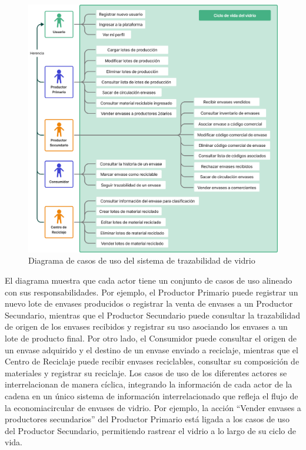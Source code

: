 \begin{figure}[!htb]
    \centering
    \includegraphics[width=\textwidth]{Figures/use-case-diagram.png}
    \caption{Diagrama de casos de uso del sistema de trazabilidad de vidrio}
    \label{fig:use-case-diagram}
\end{figure}

El diagrama muestra que cada actor tiene un conjunto de casos de uso alineado con sus responsabilidades. Por ejemplo, el Productor Primario puede registrar un nuevo lote de envases producidos o registrar la venta de envases a un Productor Secundario, mientras que el Productor Secundario puede consultar la \gls{trazabilidad} de origen de los envases recibidos y registrar su uso asociando los envases a un lote de producto final. Por otro lado, el Consumidor puede consultar el origen de un envase adquirido y el destino de un envase enviado a reciclaje, mientras que el Centro de Reciclaje puede recibir envases reciclables, consultar su composición de materiales y registrar su reciclaje. Los casos de uso de los diferentes actores se interrelacionan de manera cíclica, integrando la información de cada actor de la cadena en un único sistema de información interrelacionado que refleja el flujo de la \gls{economiacircular} de envases de vidrio. Por ejemplo, la acción ``Vender envases a productores secundarios'' del Productor Primario está ligada a los casos de uso del Productor Secundario, permitiendo rastrear el vidrio a lo largo de su ciclo de vida.

